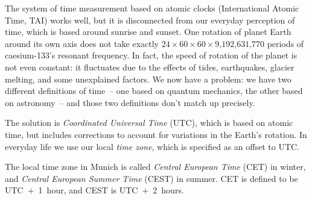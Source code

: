 The system of time measurement based on atomic clocks (International Atomic Time, TAI) works well, but it is disconnected from our everyday perception of time, which is based around sunrise and sunset.
One rotation of planet Earth around its own axis does not take exactly $24 \times 60 \times 60 \times \text{9,192,631,770}$ periods of caesium-133's resonant frequency.
In fact, the speed of rotation of the planet is not even constant: it fluctuates due to the effects of tides, earthquakes, glacier melting, and some unexplained factors.
We now have a problem: we have two different definitions of time~-- one based on quantum mechanics, the other based on astronomy~-- and those two definitions don't match up precisely.

The solution is \emph{Coordinated Universal Time} (UTC), which is based on atomic time, but includes corrections to account for variations in the Earth's rotation.
In everyday life we use our local \emph{time zone}, which is specified as an offset to UTC.

The local time zone in Munich is called \emph{Central European Time} (CET) in winter, and \emph{Central European Summer Time} (CEST) in summer.
CET is defined to be UTC~+~1~hour, and CEST is UTC~+~2~hours.

